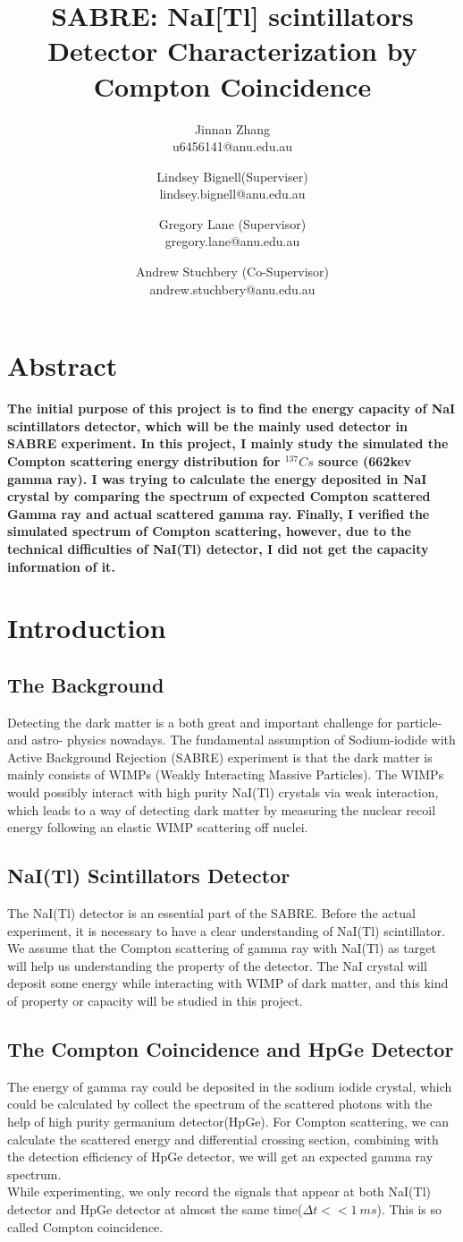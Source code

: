 \documentclass[12pt]{article}
\title{\textsf{SABRE: NaI[Tl] scintillators Detector Characterization by Compton Coincidence}}
\author{ Jinnan Zhang\\u6456141@anu.edu.au\and Lindsey Bignell(Superviser)\\lindsey.bignell@anu.edu.au \and Gregory Lane (Supervisor)\\gregory.lane@anu.edu.au\and Andrew Stuchbery (Co-Supervisor)\\andrew.stuchbery@anu.edu.au}
\date{}
\begin{document}
	\maketitle
	\section{Abstract}
	\textbf{The initial purpose of this project is to find the energy capacity of NaI scintillators detector, which will be the mainly used detector in SABRE experiment. In this project, I mainly study the simulated the Compton scattering energy distribution for $^{137}Cs$ source (662kev gamma ray). I was trying to calculate the energy deposited in NaI crystal by comparing the spectrum of  expected Compton scattered Gamma ray and actual scattered gamma ray. Finally, I verified the simulated spectrum of Compton scattering, however, due to the technical difficulties of NaI(Tl) detector, I did not get the capacity information of it.}
	\section{Introduction}
	\subsection{The Background}
	Detecting the dark matter is a both great  and important challenge for  particle- and astro- physics nowadays. The fundamental assumption of Sodium-iodide with Active Background Rejection (SABRE) experiment is that the dark matter is mainly consists of WIMPs (Weakly Interacting Massive Particles). The WIMPs would possibly interact with high purity NaI(Tl) crystals via weak interaction, which leads to a way of detecting dark matter by measuring the nuclear recoil energy following an elastic WIMP scattering off nuclei.
	\subsection{NaI(Tl) Scintillators Detector}
	The NaI(Tl) detector is an essential part of the SABRE. Before the actual experiment, it is necessary to have a clear understanding of NaI(Tl) scintillator. We assume that the Compton scattering of gamma ray with NaI(Tl) as target will help us understanding the property of the detector. The NaI crystal will deposit some energy while interacting with WIMP of dark matter, and this kind of property or capacity	 will be studied in this project.
	\subsection{The Compton Coincidence and HpGe Detector }
	The energy of gamma ray could be  deposited in the sodium iodide crystal, which could be calculated by collect the spectrum of the scattered photons with the help of high purity germanium detector(HpGe). For Compton  scattering, we can calculate  the scattered energy and differential crossing section, combining with the detection efficiency of HpGe detector, we will get an expected gamma ray spectrum. \\
	While experimenting, we only record the signals that appear at both NaI(Tl) detector and HpGe detector at almost the same time($\Delta t << 1\ ms$). This is so called Compton coincidence.
\end{document}

